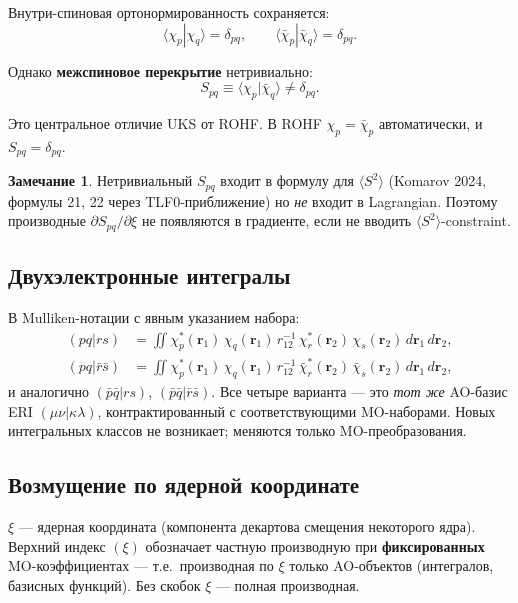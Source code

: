 \documentclass[11pt, a4paper]{article}
\theoremstyle{definition}
\newtheorem{remark}{Замечание}[section]
\newcommand{\dxi}{(\xi)}
\begin{document}
Внутри-спиновая ортонормированность сохраняется:
\begin{equation}
    \langle \chi_p | \chi_q \rangle = \delta_{pq}, \qquad
    \langle \bar\chi_p | \bar\chi_q \rangle = \delta_{pq}.
\end{equation}

Однако \textbf{межспиновое перекрытие} нетривиально:
\begin{equation}
    S_{pq} \equiv \langle \chi_p | \bar\chi_q \rangle \ne \delta_{pq}.
    \label{eq:Spq}
\end{equation}

Это центральное отличие UKS от ROHF. В ROHF $\chi_p = \bar\chi_p$ автоматически, и $S_{pq} = \delta_{pq}$.

\begin{remark}
Нетривиальный $S_{pq}$ входит в формулу для $\langle S^2 \rangle$ (Komarov 2024, формулы 21, 22 через TLF0-приближение) но \emph{не} входит в Lagrangian. Поэтому производные $\partial S_{pq}/\partial \xi$ не появляются в градиенте, если не вводить $\langle S^2 \rangle$-constraint.
\end{remark}

\subsection{Двухэлектронные интегралы}

В Mulliken-нотации с явным указанием набора:
\begin{align}
    (pq | rs) &= \iint \chi_p^*(\mathbf r_1)\, \chi_q(\mathbf r_1)\, r_{12}^{-1}\, \chi_r^*(\mathbf r_2)\, \chi_s(\mathbf r_2)\, d\mathbf r_1\, d\mathbf r_2, \\
    (pq | \bar r \bar s) &= \iint \chi_p^*(\mathbf r_1)\, \chi_q(\mathbf r_1)\, r_{12}^{-1}\, \bar\chi_r^*(\mathbf r_2)\, \bar\chi_s(\mathbf r_2)\, d\mathbf r_1\, d\mathbf r_2,
\end{align}
и аналогично $(\bar p \bar q | rs)$, $(\bar p \bar q | \bar r \bar s)$. Все четыре варианта --- это \emph{тот же} AO-базис ERI $(\mu\nu | \kappa\lambda)$, контрактированный с соответствующими MO-наборами. Новых интегральных классов не возникает; меняются только MO-преобразования.

\subsection{Возмущение по ядерной координате}

$\xi$ --- ядерная координата (компонента декартова смещения некоторого ядра). Верхний индекс $\dxi$ обозначает частную производную при \textbf{фиксированных} MO-коэффициентах --- т.е.\ производная по $\xi$ только AO-объектов (интегралов, базисных функций). Без скобок $\xi$ --- полная производная.
\end{document}
